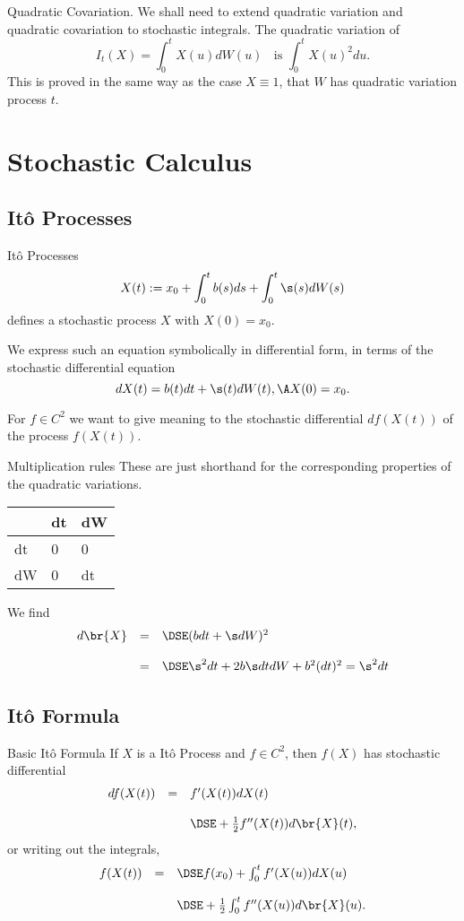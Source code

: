 Quadratic Covariation.
We shall need to
extend quadratic variation and quadratic covariation to stochastic
integrals. The quadratic variation of
	$$
	I_t(X) = \int_0^t X(u) dW(u) \;\; \mbox{ is } \int_0^t X(u)^2 du.
	$$
This is proved in the same way as the case $X \equiv 1$, that $W$
has quadratic variation process $t$.


\section{Stochastic Calculus}
\subsection{It{\^o} Processes}
It{\^o} Processes
	$$
	X(t) := x_0 + \int_0^t b(s) ds + \int_0^t \s(s) dW(s)
	$$
defines a stochastic process $X$ with $X(0) = x_0$.

We express such an equation
symbolically in differential form, in terms of the stochastic
differential equation
	$$
	dX(t) = b(t) dt + \s(t) dW(t), \A X(0) = x_0.
	$$

For $f \in C^2$ we want to give  meaning to the stochastic differential
$df(X(t))$ of the process $f(X(t))$.


Multiplication rules
	These are just shorthand for the
	corresponding properties of the quadratic variations.

	\begin{center}
	\begin{tabular}{|l|ll|}
	\hline
	& dt &dW \\\hline
	dt& 0 & 0\\
	dW & 0 &dt \\\hline
	\end{tabular}
	\end{center}

	We find
	$$
	\begin{array}{lll}
	d\br{X} &=&\DSE (b dt + \s dW)^2 \\*[12pt]
	&=&\DSE \s^2 dt + 2 b \s dt dW + b^2 (dt)^2 = \s^2 dt
	\end{array}
	$$


\subsection{It{\^o} Formula}

Basic It{\^o} Formula
	If $X$ is a  It{\^o} Process and $f\in C^2$,
	then $f(X)$ has stochastic differential
		$$
		\begin{array}{lll}
		df(X(t)) &=& f'(X(t)) dX(t)\\*[12pt]
		&& \DSE+ \frac{1}{2} f''(X(t)) d\br{X}(t),
		\end{array}
		$$
	or writing out the integrals,
		$$
		\begin{array}{lll}
		f(X(t)) &=& \DSE f(x_0) + \int_0^t f'(X(u)) dX(u)\\*[12pt]
		&& \DSE + \frac{1}{2} \int_0^t f''(X(u)) d\br{X}(u).
		\end{array}
		$$


